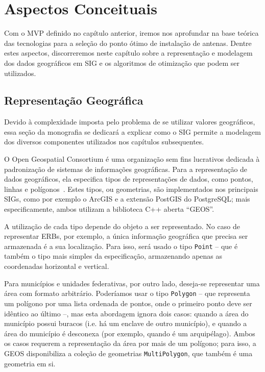 \documentclass[]{politex}
\begin{document}
\chapter{Aspectos Conceituais}

Com o MVP definido no capítulo anterior, iremos nos aprofundar na base teórica
das tecnologias para a seleção do ponto ótimo de instalação de antenas. Dentre
estes aspectos, discorreremos neste capítulo sobre a representação e modelagem
dos dados geográficos em SIG e os algoritmos de otimização que podem ser
utilizados.

\section{Representação Geográfica}

Devido à complexidade imposta pelo problema de se utilizar valores geográficos,
essa seção da monografia se dedicará a explicar como o SIG permite a modelagem
dos diversos componentes utilizados nos capítulos subsequentes.

O Open Geospatial Consortium é uma organização sem fins lucrativos dedicada à
padronização de sistemas de informações geográficas. Para a representação de
dados geográficos, ela especifica tipos de representações de dados, como pontos,
linhas e polígonos~\cite{opengis}. Estes tipos, ou geometrias, são implementados
nos principais SIGs, como por exemplo o ArcGIS e a extensão PostGIS do
PostgreSQL; mais especificamente, ambos utilizam a biblioteca C++ aberta
``GEOS''.

A utilização de cada tipo depende do objeto a ser representado. No caso de
representar ERBs, por exemplo, a única informação geográfica que precisa ser
armazenada é a sua localização. Para isso, será usado o tipo \texttt{Point} --
que é também o tipo mais simples da especificação, armazenando apenas as
coordenadas horizontal e vertical.

Para municípios e unidades federativas, por outro lado, deseja-se representar
uma área com formato arbitrário. Poderíamos usar o tipo \texttt{Polygon} -- que
representa um polígono por uma lista ordenada de pontos, onde o primeiro ponto
deve ser idêntico ao último --, mas esta abordagem ignora dois casos: quando a
área do município possui buracos (i.e. há um enclave de outro município), e
quando a área do município é desconexa (por exemplo, quando é um arquipélago).
Ambos os casos requerem a representação da área por mais de um polígono; para
isso, a GEOS disponibiliza a coleção de geometrias \texttt{MultiPolygon}, que
também é uma geometria em si.
\end{document}
